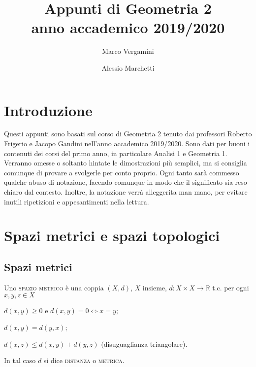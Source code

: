 \documentclass{article}
\title{Appunti di Geometria 2 \\ anno accademico 2019/2020}
\date{}
\author{Marco Vergamini \and Alessio Marchetti}
\begin{document}
\maketitle
\newpage
\tableofcontents
\newpage

\section{Introduzione}
Questi appunti sono basati sul corso di Geometria 2 tenuto dai professori
Roberto Frigerio e Jacopo Gandini nell'anno accademico 2019/2020. Sono dati per
buoni i contenuti dei corsi del primo anno, in particolare Analisi 1 e Geometria
1. Verranno omesse o soltanto hintate le dimostrazioni più semplici, ma si
consiglia comunque di provare a svolgerle per conto proprio. Ogni tanto sarà
commesso qualche abuso di notazione, facendo comunque in modo che il significato
sia reso chiaro dal contesto. Inoltre, la notazione verrà alleggerita man mano,
per evitare inutili ripetizioni e appesantimenti nella lettura.


\section{Spazi metrici e spazi topologici}
\subsection{Spazi metrici}
\begin{defn}
	Uno \textsc{spazio metrico} è una coppia $(X, d)$, $X$ insieme,
	${d: X \times X \rightarrow \mathbb{R}}$ t.c. per ogni ${x, y, z \in X}$
    \begin{nlist}
    	\item $d(x, y) \ge 0$ e $d(x, y)=0 \Leftrightarrow x=y$;
    	\item $d(x, y)=d(y, x)$;
    	\item $d(x, z) \le d(x, y)+d(y,z)$ (disuguaglianza triangolare).
    \end{nlist}
	In tal caso $d$ si dice \textsc{distanza} o \textsc{metrica}.
\end{defn}
\end{document}
